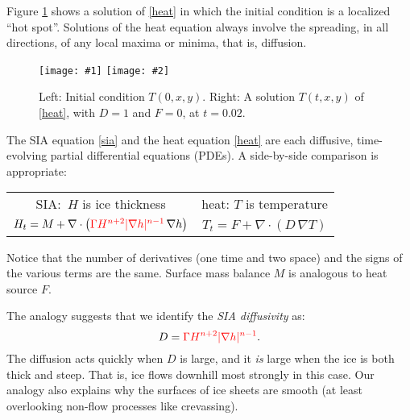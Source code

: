 \documentclass[letterpaper,final,12pt,reqno]{amsart}
\newcommand{\grad}{\nabla}
\newcommand{\Div}{\nabla\cdot}
\newcommand{\twofigsizes}[5]{
\begin{figure}[ht]
\centering
\texttt{[image: \#1]} \quad
\texttt{[image: \#2]}
\caption{#3}
\label{fig:#1}
\end{figure}}
\begin{document}
Figure \ref{fig:initialheat} shows a solution of \eqref{heat} in which the initial condition is a localized ``hot spot''.  Solutions of the heat equation always involve the spreading, in all directions, of any local maxima or minima, that is, diffusion.

\twofigsizes{initialheat}{finalheat}{Left: Initial condition $T(0,x,y)$.   Right: A solution $T(t,x,y)$ of  \eqref{heat}, with $D=1$ and $F=0$, at $t=0.02$.}{2.8in}{2.8in}

The SIA equation \eqref{sia} and the heat equation \eqref{heat} are each diffusive, time-evolving partial differential equations (PDEs).  A side-by-side comparison is appropriate:
\begin{center}
\begin{tabular}{cc}
\vspace{1mm}
SIA:\, $H$ is ice thickness & \phantom{foo bar} heat: $T$ is temperature\phantom{foo bar}  \\
\vspace{1mm}
	$H_t = M + \Div \left({\color{red}\Gamma H^{n+2} |\grad h|^{n-1}}\, \grad h \right)$  &  $T_t = F + \Div (D\, \grad T)$
\end{tabular}
\end{center}
\vspace{1mm}
Notice that the number of derivatives (one time and two space) and the signs of the various terms are the same.  Surface mass balance $M$ is analogous to heat source $F$.

The analogy suggests that we identify the \emph{SIA diffusivity} as:
\begin{equation}
	D = {\color{red}\Gamma H^{n+2} |\grad h|^{n-1}}.  \label{siadiffusivity}
\end{equation}
The diffusion acts quickly when $D$ is large, and it \emph{is} large when the ice is both thick and steep.  That is, ice flows downhill most strongly in this case.  Our analogy also explains why the surfaces of ice sheets are smooth (at least overlooking non-flow processes like crevassing).
\end{document}
